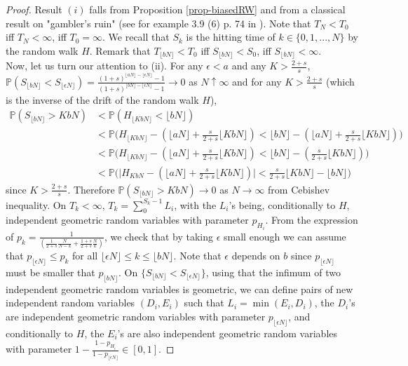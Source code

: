 \documentclass[11pt]{article}
\theoremstyle{remark}
\numberwithin{equation}{section}
\begin{document}
\begin{proof} Result $(i)$ falls from Proposition \ref{prop-biasedRW} and from a classical result on "gambler's ruin"  (see for example 3.9 (6) p. 74 in \cite{GrimmettStirzaker}). Note that $T_N<T_0$  iff $T_N<\infty$, iff $T_0=\infty$. We recall that $S_k$ is the hitting time of $k\in\{0,1,...,N\}$ by the random walk $H$. Remark that $T_{\lfloor bN\rfloor}<T_0$ iff $S_{\lfloor bN\rfloor}<S_0$, iff $S_{\lfloor bN\rfloor}<\infty$. 
\\
Now, let us turn our attention to (ii).  For any $\epsilon<a$ and any $K>\frac{2+s}{s}$, $\mathbb P(S_{\lfloor bN\rfloor}<S_{\lfloor \epsilon N\rfloor})=\frac{(1+s)^{\lfloor aN\rfloor-\lfloor \epsilon N\rfloor}-1}{(1+s)^{\lfloor bN\rfloor-\lfloor \epsilon N\rfloor}-1}\rightarrow 0$ as $N\uparrow\infty$ and for any $K>\frac{2+s}{s}$ (which is the inverse of the drift of the random walk $H$), \begin{align*}\mathbb P(S_{\lfloor bN\rfloor}>KbN)&<\mathbb P(H_{\lfloor KbN\rfloor}<\lfloor bN\rfloor)\\&<\mathbb{P}\Big(H_{\lfloor KbN\rfloor}-(\lfloor aN\rfloor+\frac{s}{2+s}\lfloor KbN\rfloor)<\lfloor bN\rfloor-(\lfloor aN\rfloor+\frac{s}{2+s}\lfloor KbN\rfloor)\Big)\\&<\mathbb{P}\Big(H_{\lfloor KbN\rfloor}-(\lfloor aN\rfloor+\frac{s}{2+s}\lfloor KbN\rfloor)<\lfloor bN\rfloor-(\frac{s}{2+s}\lfloor KbN\rfloor)\Big)\\&<\mathbb{P}\Big(\big|H_{KbN}-(\lfloor aN\rfloor+\frac{s}{2+s}\lfloor KbN\rfloor)\big|<\frac{s}{2+s}\lfloor KbN\rfloor-\lfloor bN\rfloor\Big)\end{align*} since $K>\frac{2+s}{s}$. Therefore $\mathbb P(S_{\lfloor bN\rfloor}>KbN)\rightarrow 0$ as $N\rightarrow\infty$ from Cebishev inequality. On $T_k<\infty$, $T_k=\sum_0^{S_k-1}L_i $, with the $L_i$'s being, conditionally to $H$, independent geometric random variables with parameter $p_{H_i}$. From the expression of $p_k=\frac{1}{\left(\frac{1}{2+s}\frac{N}{N-k}+\frac{1+s}{2+s}\frac{N}{k}\right)}$, we check that by taking $\epsilon$ small enough we can assume that $p_{\lfloor \epsilon N\rfloor}\leq p_k$ for all $\lfloor \epsilon N\rfloor\leq k\leq \lfloor  bN\rfloor$. Note that $\epsilon$ depends on $b$ since $p_{\lfloor \epsilon N\rfloor}$ must be smaller that $p_{\lfloor bN\rfloor}$.
On $\{S_{\lfloor bN\rfloor}<S_{\lfloor \epsilon N\rfloor}\}$, using that the infimum of two independent geometric random variables is geometric, we can  define pairs of new  independent random variables $(D_i, E_i)$ such that $L_i=\min(E_i,D_i)$, the $D_i$'s are independent geometric random variables with parameter $p_{\lfloor \epsilon N\rfloor}$, and conditionally to $H$, the $E_i$'s are also independent geometric random variables with parameter $1-\frac{1-p_{H_i}}{1-p_{\lfloor \epsilon N\rfloor}}\in[0,1]$.

\end{proof}
\end{document}
